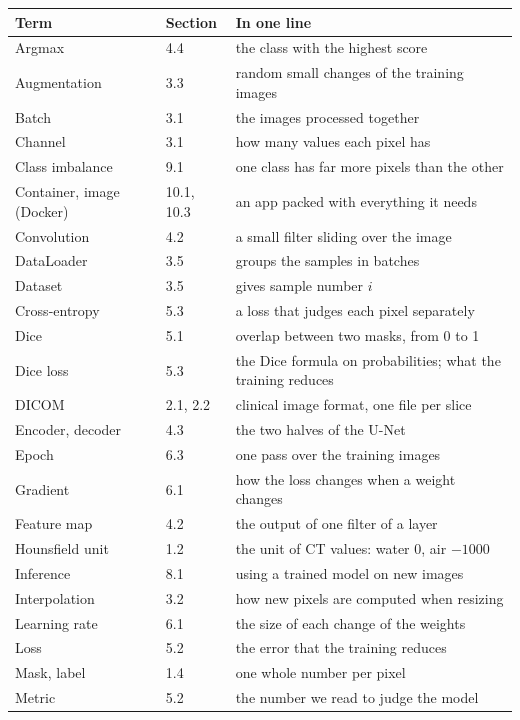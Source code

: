 \documentclass[11pt,a4paper]{article}
\renewcommand{\arraystretch}{1.25}
\begin{document}
\renewcommand{\arraystretch}{1.08}
\begin{center}
\small
\begin{tabular}{@{}llp{9cm}@{}}
\toprule
Term & Section & In one line \\
\midrule
Argmax & 4.4 & the class with the highest score \\
Augmentation & 3.3 & random small changes of the training images \\
Batch & 3.1 & the images processed together \\
Channel & 3.1 & how many values each pixel has \\
Class imbalance & 9.1 & one class has far more pixels than the other \\
Container, image (Docker) & 10.1, 10.3 & an app packed with everything it needs \\
Convolution & 4.2 & a small filter sliding over the image \\
DataLoader & 3.5 & groups the samples in batches \\
Dataset & 3.5 & gives sample number $i$ \\
Cross-entropy & 5.3 & a loss that judges each pixel separately \\
Dice & 5.1 & overlap between two masks, from 0 to 1 \\
Dice loss & 5.3 & the Dice formula on probabilities; what the training reduces \\
DICOM & 2.1, 2.2 & clinical image format, one file per slice \\
Encoder, decoder & 4.3 & the two halves of the U-Net \\
Epoch & 6.3 & one pass over the training images \\
Gradient & 6.1 & how the loss changes when a weight changes \\
Feature map & 4.2 & the output of one filter of a layer \\
Hounsfield unit & 1.2 & the unit of CT values: water 0, air $-1000$ \\
Inference & 8.1 & using a trained model on new images \\
Interpolation & 3.2 & how new pixels are computed when resizing \\
Learning rate & 6.1 & the size of each change of the weights \\
Loss & 5.2 & the error that the training reduces \\
Mask, label & 1.4 & one whole number per pixel \\
Metric & 5.2 & the number we read to judge the model \\

\end{tabular}
\end{center}
\end{document}
